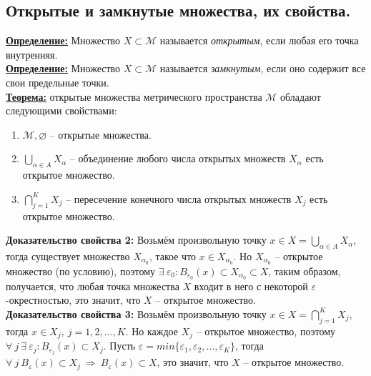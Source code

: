 \documentclass[a4paper,12pt]{article} %
\begin{document}
\subsection{Открытые и замкнутые множества, их свойства.}

\underline{\textbf{Определение:}} Множество $X \subset \mathscr{M}$ называется \textit{открытым}, если любая его точка внутренняя.\\

\underline{\textbf{Определение:}} Множество $X \subset \mathscr{M}$ называется \textit{замкнутым}, если оно содержит все свои предельные точки.\\

\underline{\textbf{Теорема:}} открытые множества метрического пространства $\mathscr{M}$ обладают следующими свойствами:

\begin{enumerate}
    \item $\mathscr{M}, \varnothing$ -- открытые множества.
    \item $\bigcup \limits_{\alpha \in A} X_{\alpha}$ -- объединение любого числа открытых множеств $X_{\alpha}$ есть открытое множество.
    \item $\bigcap \limits_{j = 1}^K X_j$ -- пересечение конечного числа открытых множеств $X_j$ есть открытое множество.
\end{enumerate}

\textbf{Доказательство свойства 2:} Возьмём произвольную точку $x \in X = \bigcup \limits_{\alpha \in A} X_{\alpha}$, тогда существует множество $X_{\alpha_0}$, такое что $x \in X_{\alpha_0}$. Но $X_{\alpha_0}$ -- открытое множество (по условию), поэтому $\exists ~ \varepsilon_0 : B_{\varepsilon_0}(x) \subset X_{\alpha_0} \subset X$, таким образом, получается, что любая точка множества $X$ входит в него с некоторой $\varepsilon$-окрестностью, это значит, что $X$ -- открытое множество.\\

\textbf{Доказательство свойства 3:} Возьмём произвольную точку $x \in X = \bigcap \limits_{j = 1}^K X_{j}$, тогда $x \in X_j, ~ j = 1, 2, \dots, K$. Но каждое $X_j$ -- открытое множество, поэтому $\forall ~ j ~ \exists ~ \varepsilon_j : B_{\varepsilon_j}(x) \subset X_j$. Пусть $\varepsilon = min \{\varepsilon_1, \varepsilon_2, \dots, \varepsilon_K \}$, тогда $\forall ~ j ~ B_{\varepsilon}(x) \subset X_j ~ \Rightarrow ~ B_{\varepsilon}(x) \subset X$, это значит, что $X$ -- открытое множество.\\
\end{document}
